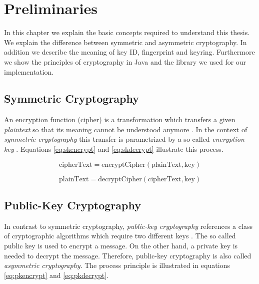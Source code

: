 \chapter{Preliminaries}
\label{chapter:pre}

In this chapter we explain the basic concepts required to understand this thesis. We explain the difference between symmetric and asymmetric cryptography. In addition we describe the meaning of key ID, fingerprint and keyring. Furthermore we show the principles of cryptography in Java and the library we used for our implementation.

\section{Symmetric Cryptography} \label{section:pre:symcrypto}


An encryption function (cipher) is a transformation which transfers a given \textit{plaintext} so that its meaning cannot be understood anymore \citep[section 1.4]{HAC}. In the context of \textit{symmetric cryptography} this transfer is parametrized by a so called \textit{encryption key}  \citep[section 1.5]{HAC}. Equations \ref{eq:skencrypt} and \ref{eq:skdecrypt} illustrate this process.

\begin{equation} \label{eq:skencrypt}
	\text{cipherText} = \text{encryptCipher}(\text{plainText}, \text{key})
\end{equation}

\begin{equation} \label{eq:skdecrypt}
	\text{plainText} = \text{decryptCipher}(\text{cipherText}, \text{key})
\end{equation}


\section{Public-Key Cryptography}
\label{section:pre:publiccrypto}

In contrast to  {symmetric cryptography}, \textit{public-key cryptography} references a class of cryptographic algorithms which require two different keys \citep[section 1.8]{HAC}. The so called public key is used to encrypt a message. On the other hand, a private key is needed to decrypt the message. Therefore, public-key cryptography is also called \textit{asymmetric cryptography}.  The process principle is illustrated in equations \ref{eq:pkencrypt} and \ref{eq:pkdecrypt}. 

